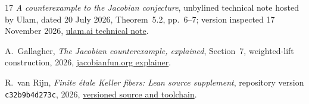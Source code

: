 \begin{thebibliography}{17}
\emph{A counterexample to the Jacobian conjecture},
unbylined technical note hosted by Ulam, dated 20 July 2026,
Theorem~5.2, pp.~6--7; version inspected 17 November 2026,
\href{https://www.ulam.ai/research/jacobian.pdf}{ulam.ai technical note}.

A.~Gallagher,
\emph{The Jacobian counterexample, explained},
Section~7, weighted-lift construction, 2026,
\href{https://jacobianfun.org/jacobian-explained}{jacobianfun.org explainer}.

R.~van Rijn,
\emph{Finite \'etale Keller fibers: Lean source supplement},
repository version \texttt{c32b9b4d273c}, 2026,
\href{https://github.com/royvanrijn/jacobian-research/tree/c32b9b4d273cf7988e85184a0d5eae9c488727fd/research/foundations/formal/finite-etale-keller}
{versioned source and toolchain}.

\end{thebibliography}
